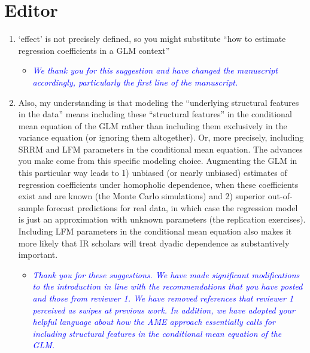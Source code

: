 \section*{Editor}

\begin{enumerate}
	\item `effect' is not precisely defined, so you might substitute ``how to estimate regression coefficients in a GLM context''
	\begin{itemize}
		\item \textcolor{blue}{ \emph{
		We thank you for this suggestion and have changed the manuscript accordingly, particularly the first line of the manuscript.}}
	\end{itemize}
	\item Also, my understanding is that modeling the ``underlying structural features in the data'' means including these ``structural features'' in the conditional mean equation of the GLM rather than including them exclusively in the variance equation (or ignoring them altogether). Or, more precisely, including SRRM and LFM parameters in the conditional mean equation. The advances you make come from this specific modeling choice. Augmenting the GLM in this particular way leads to 1) unbiased (or nearly unbiased) estimates of regression coefficients under homopholic dependence, when these coefficients exist and are known (the Monte Carlo simulations) and 2) superior out-of-sample forecast predictions for real data, in which case the regression model is just an approximation with unknown parameters (the replication exercises). Including LFM parameters in the conditional mean equation also makes it more likely that IR scholars will treat dyadic dependence as substantively important.
	\begin{itemize}
		\item \textcolor{blue}{ \emph{
			Thank you for these suggestions. We have made significant modifications to the introduction in line with the recommendations that you have posted and those from reviewer 1. We have removed references that reviewer 1 perceived as swipes at previous work. In addition, we have adopted your helpful language about how the AME approach essentially calls for including structural features in the conditional mean equation of the GLM. 
			}}
	\end{itemize}
\end{enumerate}
